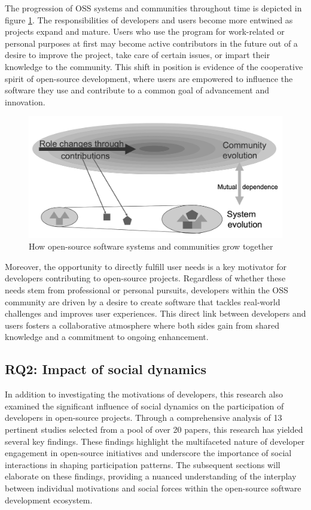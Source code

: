 The progression of OSS systems and communities throughout time is depicted in figure \ref{fig:roleMotivation}.  The responsibilities of developers and users become more entwined as projects expand and mature.  Users who use the program for work-related or personal purposes at first may become active contributors in the future out of a desire to improve the project, take care of certain issues, or impart their knowledge to the community.  This shift in position is evidence of the cooperative spirit of open-source development, where users are empowered to influence the software they use and contribute to a common goal of advancement and innovation.


\begin{figure}[ht]
    \centering
    \includegraphics[width=0.65\linewidth]{figs/roleMotivation.png}
    \caption{How open-source software systems and communities grow together \cite{06ye2003toward} }
    \label{fig:roleMotivation}
\end{figure}



Moreover, the opportunity to directly fulfill user needs is a key motivator for developers contributing to open-source projects. Regardless of whether these needs stem from professional or personal pursuits, developers within the OSS community are driven by a desire to create software that tackles real-world challenges and improves user experiences. This direct link between developers and users fosters a collaborative atmosphere where both sides gain from shared knowledge and a commitment to ongoing enhancement.

\subsection{RQ2: Impact of social dynamics}

In addition to investigating the motivations of developers, this research also examined the significant influence of social dynamics on the participation of developers in open-source projects. Through a comprehensive analysis of 13 pertinent studies selected from a pool of over 20 papers, this research has yielded several key findings. These findings highlight the multifaceted nature of developer engagement in open-source initiatives and underscore the importance of social interactions in shaping participation patterns. The subsequent sections will elaborate on these findings, providing a nuanced understanding of the interplay between individual motivations and social forces within the open-source software development ecosystem.

